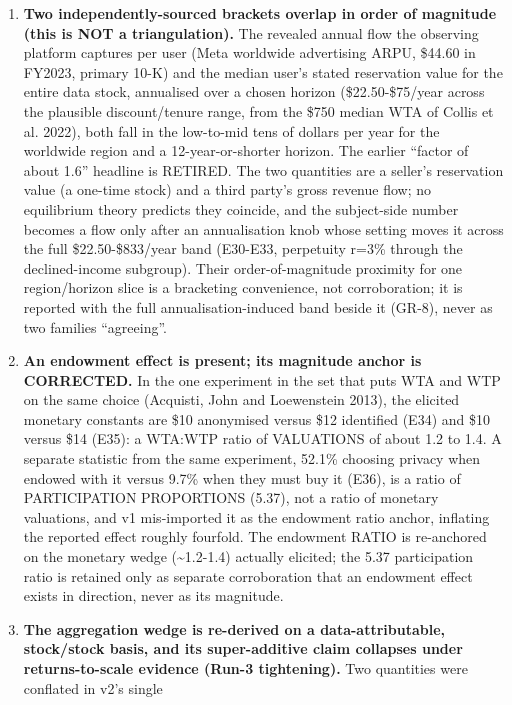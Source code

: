 \documentclass[
  11pt,
]{article}
\begin{document}
\begin{enumerate}
\def\labelenumi{\arabic{enumi}.}
\item
  \textbf{Two independently-sourced brackets overlap in order of
  magnitude (this is NOT a triangulation).} The revealed annual flow the
  observing platform captures per user (Meta worldwide advertising ARPU,
  \$44.60 in FY2023, primary 10-K) and the median user's stated
  reservation value for the entire data stock, annualised over a chosen
  horizon (\$22.50-\$75/year across the plausible discount/tenure range,
  from the \$750 median WTA of Collis et al. 2022), both fall in the
  low-to-mid tens of dollars per year for the worldwide region and a
  12-year-or-shorter horizon. The earlier ``factor of about 1.6''
  headline is RETIRED. The two quantities are a seller's reservation
  value (a one-time stock) and a third party's gross revenue flow; no
  equilibrium theory predicts they coincide, and the subject-side number
  becomes a flow only after an annualisation knob whose setting moves it
  across the full \$22.50-\$833/year band (E30-E33, perpetuity r=3\%
  through the declined-income subgroup). Their order-of-magnitude
  proximity for one region/horizon slice is a bracketing convenience,
  not corroboration; it is reported with the full annualisation-induced
  band beside it (GR-8), never as two families ``agreeing''.
\item
  \textbf{An endowment effect is present; its magnitude anchor is
  CORRECTED.} In the one experiment in the set that puts WTA and WTP on
  the same choice (Acquisti, John and Loewenstein 2013), the elicited
  monetary constants are \$10 anonymised versus \$12 identified (E34)
  and \$10 versus \$14 (E35): a WTA:WTP ratio of VALUATIONS of about 1.2
  to 1.4. A separate statistic from the same experiment, 52.1\% choosing
  privacy when endowed with it versus 9.7\% when they must buy it (E36),
  is a ratio of PARTICIPATION PROPORTIONS (5.37), not a ratio of
  monetary valuations, and v1 mis-imported it as the endowment ratio
  anchor, inflating the reported effect roughly fourfold. The endowment
  RATIO is re-anchored on the monetary wedge (\textasciitilde1.2-1.4)
  actually elicited; the 5.37 participation ratio is retained only as
  separate corroboration that an endowment effect exists in direction,
  never as its magnitude.
\item
  \textbf{The aggregation wedge is re-derived on a data-attributable,
  stock/stock basis, and its super-additive claim collapses under
  returns-to-scale evidence (Run-3 tightening).} Two quantities were
  conflated in v2's single


\end{enumerate}
\end{document}
